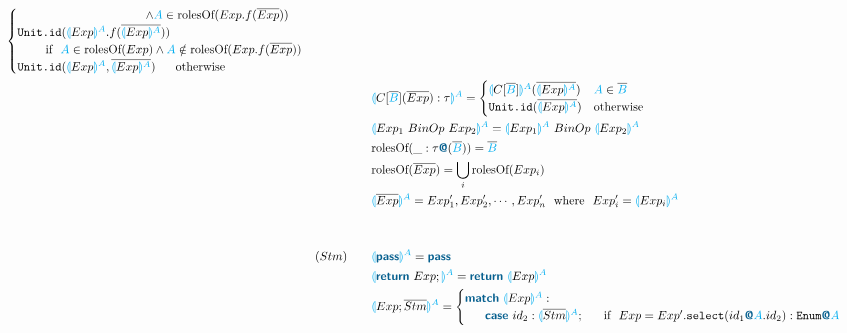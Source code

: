 \documentclass{thesis}
\newcommand{\projection}[2]{{\color{cyan}\llparenthesis}#1{\color{cyan}\rrparenthesis^#2}}
\newcommand{\mblue}[1]{\textbf{\textsf{\color{MidnightBlue}#1}}}
\newcommand{\cyan}[1]{\color{cyan}#1}
\begin{document}
\begin{alignat*}{2}
\begin{cases}
    ~~~~~~~~~~~~~~~~~~~~~~~~~~~~~~~~ \wedge {\color{cyan}A} \in \text{rolesOf}(Exp.f(\overline{Exp}))\\
    \texttt{Unit.id}(\projection{Exp}{A}.f(\overline{\projection{Exp}{A}})) \\
    ~~~~~~~\text{if}~~ {\color{cyan}A} \in \text{rolesOf}(Exp) \wedge {\color{cyan}A} \notin \text{rolesOf}(Exp.f(\overline{Exp}))\\
    \texttt{Unit.id}(\projection{Exp}{A},\overline{\projection{Exp}{A}}) ~~~~~\text{otherwise}
  \end{cases}\\
  &&&\projection{C[\overline{\color{cyan}B}](\overline{Exp}):\tau}{A}=
  \begin{cases}
    \projection{C[\overline{\color{cyan}B}]}{A} (\overline{\projection{Exp}{A}}) & {\color{cyan}A} \in \overline{\color{cyan}B}\\
    \texttt{Unit.id}(\overline{\projection{Exp}{A}}) &\text{otherwise}
  \end{cases}\\
  &&&\projection{Exp_1 ~BinOp~ Exp_2}{A} = \projection{Exp_1}{A} ~BinOp~ \projection{Exp_2}{A}\\
  &&&\text{rolesOf}(\_:\tau\mblue{@}(\overline{\color{cyan}B})) = {\overline{\color{cyan}B}}\\
  &&&\text{rolesOf}(\overline{Exp}) = \bigcup_i \text{rolesOf}(Exp_i) \\
  &&&\projection{\overline{Exp}}{A} = Exp'_1,Exp'_2,\cdots,Exp'_n ~~\text{where}~~ Exp'_i = \projection{Exp_i}{A}\\ 
  \\
  \\ 
  &(Stm)~~~ &&\projection{\mblue{pass}}{A} = \mblue{pass}\\
  &&&\projection{\mblue{return} ~ Exp;}{A} = \mblue{return} ~ \projection{Exp}{A}\\
  &&&\projection{Exp;\overline{Stm}}{A} =
  \begin{cases}
    \mblue{match} ~\projection{Exp}{A}: \\
    ~~~~~\mblue{case} ~id_2: \projection{\overline{Stm}}{A};~~~~~ \text{if}~~Exp = Exp'.\texttt{select}(id_1\mblue{@}{\cyan{A}}.id_2):\texttt{Enum}\mblue{@}{\cyan{A}}\\ %

\end{cases}
\end{alignat*}
\end{document}
